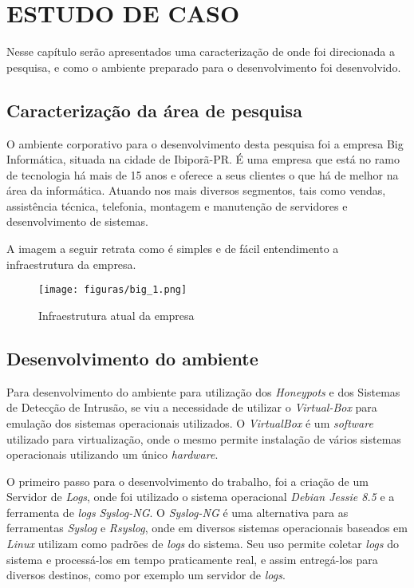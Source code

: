 \chapter{ESTUDO DE CASO}
Nesse capítulo serão apresentados uma caracterização de onde foi direcionada a pesquisa, e como o ambiente preparado para o desenvolvimento foi desenvolvido.

\section{Caracterização da área de pesquisa}
O ambiente corporativo para o desenvolvimento desta pesquisa foi a empresa Big Informática, situada na cidade de Ibiporã-PR. É uma empresa que está no ramo de tecnologia há mais de 15 anos e oferece a seus clientes o que há de melhor na área da informática. Atuando nos mais diversos segmentos, tais como vendas, assistência técnica, telefonia, montagem e manutenção de servidores e desenvolvimento de sistemas.

A imagem a seguir retrata como é simples e de fácil entendimento a infraestrutura da empresa.

\begin{figure}[!h]
\centering
\texttt{[image: figuras/big\_1.png]}
\caption{Infraestrutura atual da empresa} 	
\end{figure}

\section{Desenvolvimento do ambiente}
Para desenvolvimento do ambiente para utilização dos \textit{Honeypots} e dos Sistemas de Detecção de Intrusão, se viu a necessidade de utilizar o \textit{Virtual-Box} para emulação dos sistemas operacionais utilizados. O \textit{VirtualBox} é um \textit{software} utilizado para virtualização, onde o mesmo permite instalação de vários sistemas operacionais utilizando um único \textit{hardware}. 

O primeiro passo para o desenvolvimento do trabalho, foi a criação de um Servidor de \textit{Logs}, onde foi utilizado o sistema operacional \textit{Debian Jessie 8.5} e a ferramenta de \textit{logs} \textit{Syslog-NG}. O \textit{Syslog-NG} é uma alternativa para as ferramentas \textit{Syslog} e \textit{Rsyslog}, onde em diversos sistemas operacionais baseados em \textit{Linux} utilizam como padrões de \textit{logs} do sistema. Seu uso permite coletar \textit{logs} do sistema e processá-los em tempo praticamente real, e assim entregá-los para diversos destinos, como por exemplo um servidor de \textit{logs}.

